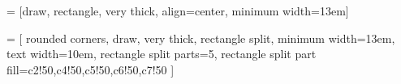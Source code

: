\def\nnboxminwidth{13em}
\def\nnboxtextwidth{10em}
\def\nnboxminheight{3em}



\def\cnncolor{c2!50}
\def\densecolor{c2!30}

\def\batchnormcolor{c4!50}
\def\actcolor{c5!50}
\def\maxpoolcolor{c6!50}
\def\dropoutcolor{c7!50}

\def\glasgowcolor{c9!20}
\def\resnetcolor{c9!20}

\def\subtractcolor{c4!50}
\def\pcacolor{c6!50}

\def\fxcolor{c2!50}
\def\combocolor{c5!50}
\def\classifiercolor{c7!50}



\newcommand{\indexecgtext}{\textbf{Index ECG}\\12 leads, 10 seconds}
\newcommand{\priorecgtext}{\textbf{Prior ECG}\\12 leads, 10 seconds}
\newcommand{\clinicaltext}{\textbf{Additional clinical variables}\\Age, sex, hs-cTnT, $\Delta$t}
\newcommand{\glasgowtext}{\textbf{Glasgow Algorithm}\\228 features}
\newcommand{\predictiontext}{\textbf{Prediction}\\MACE within 30 days}
\newcommand{\difftext}{\textbf{Subtract}}
\newcommand{\resnettext}{\textbf{Residual Network}\\5120 features}

\def\concatsize{3pt}

 = [draw, rectangle, very thick, align=center, minimum width=\nnboxminwidth]

 = [
	rounded corners, draw, very thick, rectangle split, 
	minimum width=\nnboxminwidth, 
	text width=\nnboxtextwidth,
	rectangle split parts=5, 
	rectangle split part fill={\cnncolor,\batchnormcolor,\actcolor,\maxpoolcolor,\dropoutcolor}
]

